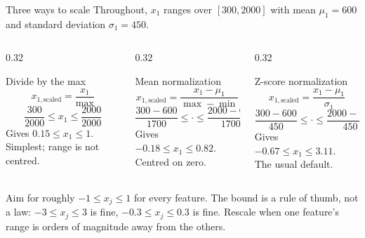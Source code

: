 \documentclass[aspectratio=169,10pt]{beamer}
\begin{document}
\begin{frame}{Three ways to scale}
  \footnotesize
  Throughout, $x_1$ ranges over $[300, 2000]$ with mean $\mu_1 = 600$ and standard
  deviation $\sigma_1 = 450$.
  \vspace{1mm}
  \begin{columns}[T,onlytextwidth]
    \begin{column}{0.32\textwidth}
      \begin{block}{Divide by the max}
        \[ x_{1,\text{scaled}} = \frac{x_1}{\max} \]
        \[ \frac{300}{2000} \le x_1 \le \frac{2000}{2000} \]
        Gives $0.15 \le x_1 \le 1$.\\[2pt]
        Simplest; range is not centred.
      \end{block}
    \end{column}
    \begin{column}{0.32\textwidth}
      \begin{block}{Mean normalization}
        \[ x_{1,\text{scaled}} = \frac{x_1-\mu_1}{\max-\min} \]
        \[ \frac{300-600}{1700} \le \cdot \le \frac{2000-600}{1700} \]
        Gives $-0.18 \le x_1 \le 0.82$.\\[2pt]
        Centred on zero.
      \end{block}
    \end{column}
    \begin{column}{0.32\textwidth}
      \begin{block}{Z-score normalization}
        \[ x_{1,\text{scaled}} = \frac{x_1-\mu_1}{\sigma_1} \]
        \[ \frac{300-600}{450} \le \cdot \le \frac{2000-600}{450} \]
        Gives $-0.67 \le x_1 \le 3.11$.\\[2pt]
        The usual default.
      \end{block}
    \end{column}
  \end{columns}
  \vspace{2mm}
  \begin{keyidea}
    Aim for roughly $-1 \le x_j \le 1$ for every feature. The bound is a rule of thumb, not a
    law: $-3\le x_j\le 3$ is fine, $-0.3\le x_j\le 0.3$ is fine. Rescale when one feature's
    range is orders of magnitude away from the others.
  \end{keyidea}
\end{frame}
\end{document}
